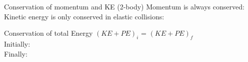  \begin{frame}{Conservation of momentum and KE (2-body)}
\small
Momentum is always conserved:\\[10ex]




Kinetic energy is only conserved in elastic collisions:\\[10ex]


\end{frame}


 \begin{frame}{Conservation of total Energy}
\small
$(KE+PE)_i$ = $(KE+PE)_f$\\[4ex]

Initially:\\[10ex]


Finally:\\[10ex]




\end{frame}

